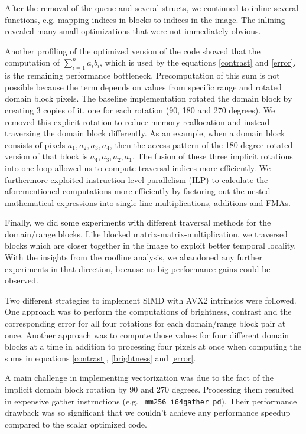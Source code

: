 After the removal of the queue and several structs, we continued to inline several functions, e.g. mapping indices in blocks
to indices in the image. The inlining revealed many small optimizations that were not immediately obvious.

Another profiling of the optimized version of the code showed that the computation of $\sum_{i=1}^n a_i b_i$, which is used by the equations
\ref{contrast} and \ref{error}, is the remaining performance bottleneck. Precomputation of this sum is not possible
because the term depends on values from specific range and rotated domain block pixels. The baseline implementation rotated
the domain block by creating 3 copies of it, one for each rotation (90, 180 and 270 degrees). We removed this explicit rotation
to reduce memory reallocation and instead traversing the domain block differently. As an example, when a domain block consists
of pixels $a_1, a_2, a_3, a_4$, then the access pattern of the 180 degree rotated version of that block is $a_4, a_3, a_2, a_1$.
The fusion of these three implicit rotations into one loop allowed us to compute traversal indices more efficiently.
We furthermore exploited instruction level parallelism (ILP) to calculate the aforementioned computations more efficiently
by factoring out the nested mathematical expressions into single line multiplications, additions and FMAs.

Finally, we did some experiments with different traversal methods for the
domain/range blocks. Like blocked matrix-matrix-multiplication, we traversed
blocks which are closer together in the image to exploit better temporal
locality. With the insights from the roofline analysis, we abandoned any further
experiments in that direction, because no big performance gains could be
observed.

 Two different strategies to implement SIMD with AVX2 intrinsics
were followed. One approach was to perform the computations of brightness,
contrast and the corresponding error for all four rotations for each
domain/range block pair at once. Another approach was to compute
those values for four different domain blocks at a time in
addition to processing four pixels at once when computing the sums in equations
\ref{contrast}, \ref{brightness} and \ref{error}.

A main challenge in implementing vectorization was due to the fact of the implicit
domain block rotation by 90 and 270 degrees. Processing them resulted in expensive
gather instructions (e.g. \verb|_mm256_i64gather_pd|). Their performance drawback was
so significant that we couldn't achieve any performance speedup compared to the scalar
optimized code.

